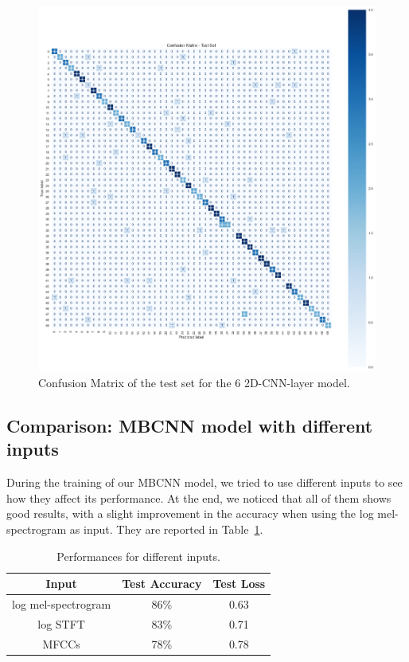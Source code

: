 \documentclass{article}
\begin{document}
\begin{sloppy}
\begin{figure}[ht]
  \centering
  \centerline{\includegraphics[width=\columnwidth]{6_2D_CNN_layer_model_confusion_matrix_test.png}}
  \caption{Confusion Matrix of the test set for the 6 2D-CNN-layer model.}
  \label{fig:6_2D_CNN_layer_model_confusion_matrix_test}
\end{figure}


\subsection{Comparison: MBCNN model with different inputs}
\label{sec:comparison_1}
During the training of our MBCNN model, we tried to use different inputs to see how they affect its performance.
At the end, we noticed that all of them shows good results, with a slight improvement in the accuracy when using the log mel-spectrogram as input.
They are reported in Table~\ref{tab:comparison_inputs1}.

\begin{table}[ht]
  \centering
  \caption{Performances for different inputs.}
  \label{tab:comparison_inputs1}
  \begin{tabular}{|c|c|c|}
    \hline
    Input & Test Accuracy & Test Loss \\
    \hline
    log mel-spectrogram & 86\% & 0.63 \\
    log STFT & 83\% & 0.71 \\
    MFCCs & 78\% & 0.78 \\
    \hline
  \end{tabular}
\end{table}


\end{sloppy}
\end{document}
